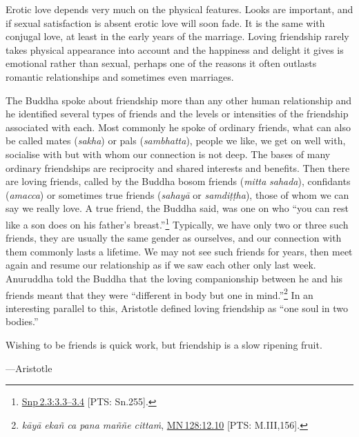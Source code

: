 \documentclass[10pt, openright]{book}
\newenvironment{epigram-2}%
{%
\vspace{1em}
\noindent
\quoting[leftmargin=2.5cm,rightmargin=2.5cm]%
\begin{itshape}
\large
}%
{\end{itshape}\endquoting
}%
\newenvironment{epigram-2-cite}%
{%
\quoting[leftmargin=2.5cm,rightmargin=2.5cm]%
\noindent\normal\hspace*{\fill} 
}%
{\endquoting\vspace{1em}
}%
\begin{document}
Erotic love depends very much on the physical features. Looks are important, and if sexual satisfaction is absent erotic love will soon fade. It is the same with conjugal love, at least in the early years of the marriage. Loving friendship rarely takes physical appearance into account and the happiness and delight it gives is emotional rather than sexual, perhaps one of the reasons it often outlasts romantic relationships and sometimes even marriages.


The Buddha spoke about friendship more than any other human relationship and he identified several types of friends and the levels or intensities of the friendship associated with each. Most commonly he spoke of ordinary friends, what can also be called mates (\textit{sakha}) or pals (\textit{sambhatta}), people we like, we get on well with, socialise with but with whom our connection is not deep. The bases of many ordinary friendships are reciprocity and shared interests and benefits. Then there are loving friends, called by the Buddha bosom friends (\textit{mitta} \textit{sahada}), confidants (\textit{amacca}) or sometimes true friends (\textit{sahayā} or \textit{samdiṭṭha}), those of whom we can say we really love. A true friend, the Buddha said, was one on who “you can rest like a son does on his father’s breast.”\footnote {\href{https://suttacentral.net/snp2.3/en/sujato\#3.3}{Snp 2.3:3.3–3.4} [PTS: Sn.255].} Typically, we have only two or three such friends, they are usually the same gender as ourselves, and our connection with them commonly lasts a lifetime. We may not see such friends for years, then meet again and resume our relationship as if we saw each other only last week. Anuruddha told the Buddha that the loving companionship between he and his friends meant that they were “different in body but one in mind.”\footnote {\textit{kāyā ekañ ca pana maññe cittaṁ}, \href{https://suttacentral.net/mn128/en/sujato\#12.10}{MN 128:12.10} [PTS: M.III,156].} In an interesting parallel to this, Aristotle defined loving friendship as “one soul in two bodies.”


\begin{epigram-2}
Wishing to be friends is quick work, but friendship is a slow ripening fruit.
\end{epigram-2}

\begin{epigram-2-cite}
—Aristotle
\end{epigram-2-cite}
\end{document}
